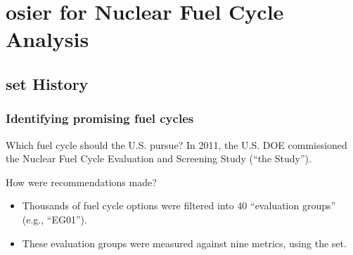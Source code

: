 \section{\gls{osier} for Nuclear Fuel Cycle Analysis}

\subsection{\gls{set} History}
\begin{frame}
    \frametitle{Identifying promising fuel cycles}
    \begin{block}{Which fuel cycle should the U.S. pursue?}
        In 2011, the U.S. \Gls{DOE} commissioned the Nuclear Fuel Cycle
        Evaluation and Screening Study (``the Study'').
    \end{block}
    \begin{block}{How were recommendations made?}
        \begin{itemize}
            \item Thousands of fuel cycle options were filtered into 40
            ``evaluation groups'' (e.g., ``EG01'').
            \item These evaluation groups were measured against nine metrics,
            using the \gls{set}.
        \end{itemize}
    \end{block}
\end{frame}

